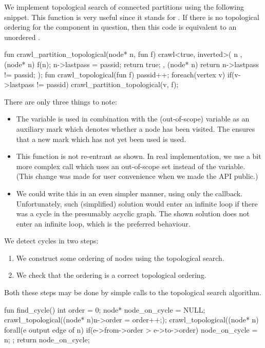 We implement topological search of connected partitions using the following snippet. This function is very useful since it stands for . If there is no topological ordering for the component in question, then this code is equivalent to an unordered .

\mybeginfig %
\begin{code}
fun crawl_partition_topological(node* n, fun f)
{
  crawl<true, inverted>( n
    , (node* n){ f(n); n->lastpass = passid; return true;}
    , (node* n){ return n->lastpass != passid;}
  );
}
fun crawl_topological(fun f)
{
  passid++;
  foreach(vertex v)
    if(v->lastpass != passid)
      crawl_partition_topological(v, f);
}
\end{code}

There are only three things to note:
\begin{itemize}
  \item The  variable is used in combination with the (out-of-scope)  variable as an auxiliary mark which denotes whether a node has been visited. The  ensures that a new mark which has not yet been used is used.
  \item This function is not re-entrant as shown. In real implementation, we use a bit more complex call which uses an out-of-scope set instead of the  variable. (This change was made for user convenience when we made the API public.)
  \item We could write this in an even simpler manner, using only the  callback. Unfortunately, such (simplified) solution would enter an infinite loop if there was a cycle in the presumably acyclic graph. The shown solution does not enter an infinite loop, which is the preferred behaviour. 
\end{itemize}

We detect cycles in two steps:
\begin{enumerate}
  \item We construct some ordering of nodes using the topological search.
  \item We check that the ordering is a correct topological ordering.
\end{enumerate}

Both these steps may be done by simple calls to the topological search algorithm.

\mybeginfig %
\begin{code}
fun find_cycle()
{
  int order = 0;
  node* node_on_cycle = NULL;
  crawl_topological((node* n){n->order = order++;});
  crawl_topological((node* n){
    forall(e output edge of n) 
      if(e->from->order > e->to->order)
        node_on_cycle = n;
  };
  return node_on_cycle;
}
\end{code}

